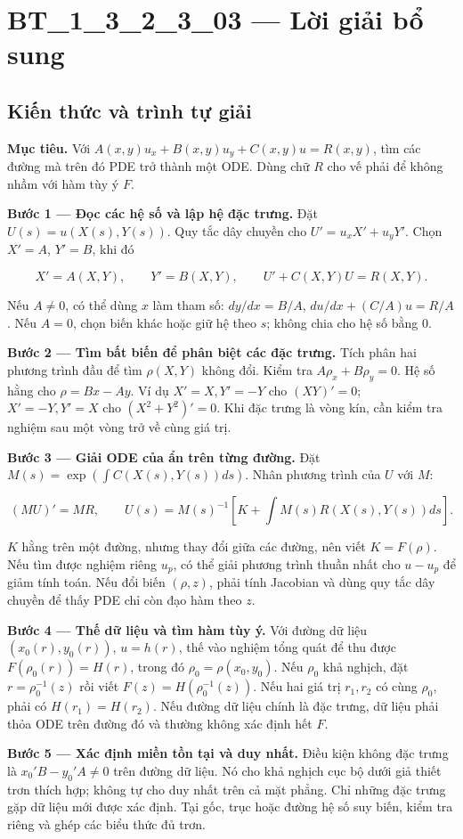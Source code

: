 \documentclass[10pt,a4paper]{article}
\begin{document}
\section*{BT\_1\_3\_2\_3\_03 — Lời giải bổ sung}
\subsection*{Kiến thức và trình tự giải}
\textbf{Mục tiêu.} Với $A(x,y)u_x+B(x,y)u_y+C(x,y)u=R(x,y)$, tìm các đường mà trên đó PDE trở thành một ODE. Dùng chữ $R$ cho vế phải để không nhầm với hàm tùy ý $F$.

\textbf{Bước 1 — Đọc các hệ số và lập hệ đặc trưng.} Đặt $U(s)=u(X(s),Y(s))$. Quy tắc dây chuyền cho $U'=u_xX'+u_yY'$. Chọn $X'=A$, $Y'=B$, khi đó

\[
X'=A(X,Y),\qquad Y'=B(X,Y),\qquad U'+C(X,Y)U=R(X,Y).
\]

Nếu $A\ne0$, có thể dùng $x$ làm tham số: $dy/dx=B/A$, $du/dx+(C/A)u=R/A$. Nếu $A=0$, chọn biến khác hoặc giữ hệ theo $s$; không chia cho hệ số bằng 0.

\textbf{Bước 2 — Tìm bất biến để phân biệt các đặc trưng.} Tích phân hai phương trình đầu để tìm $\rho(X,Y)$ không đổi. Kiểm tra $A\rho_x+B\rho_y=0$. Hệ số hằng cho $\rho=Bx-Ay$. Ví dụ $X'=X,Y'=-Y$ cho $(XY)'=0$; $X'=-Y,Y'=X$ cho $(X^2+Y^2)'=0$. Khi đặc trưng là vòng kín, cần kiểm tra nghiệm sau một vòng trở về cùng giá trị.

\textbf{Bước 3 — Giải ODE của ẩn trên từng đường.} Đặt $M(s)=\exp(\int C(X(s),Y(s))ds)$. Nhân phương trình của $U$ với $M$:

\[
(MU)'=MR,\qquad
U(s)=M(s)^{-1}\left[K+\int M(s)R(X(s),Y(s))ds\right].
\]

$K$ hằng trên một đường, nhưng thay đổi giữa các đường, nên viết $K=F(\rho)$. Nếu tìm được nghiệm riêng $u_p$, có thể giải phương trình thuần nhất cho $u-u_p$ để giảm tính toán. Nếu đổi biến $(\rho,z)$, phải tính Jacobian và dùng quy tắc dây chuyền để thấy PDE chỉ còn đạo hàm theo $z$.

\textbf{Bước 4 — Thế dữ liệu và tìm hàm tùy ý.} Với đường dữ liệu $(x_0(r),y_0(r))$, $u=h(r)$, thế vào nghiệm tổng quát để thu được $F(\rho_0(r))=H(r)$, trong đó $\rho_0=\rho(x_0,y_0)$. Nếu $\rho_0$ khả nghịch, đặt $r=\rho_0^{-1}(z)$ rồi viết $F(z)=H(\rho_0^{-1}(z))$. Nếu hai giá trị $r_1,r_2$ có cùng $\rho_0$, phải có $H(r_1)=H(r_2)$. Nếu đường dữ liệu chính là đặc trưng, dữ liệu phải thỏa ODE trên đường đó và thường không xác định hết $F$.

\textbf{Bước 5 — Xác định miền tồn tại và duy nhất.} Điều kiện không đặc trưng là $x_0'B-y_0'A\ne0$ trên đường dữ liệu. Nó cho khả nghịch cục bộ dưới giả thiết trơn thích hợp; không tự cho duy nhất trên cả mặt phẳng. Chỉ những đặc trưng gặp dữ liệu mới được xác định. Tại gốc, trục hoặc đường hệ số suy biến, kiểm tra riêng và ghép các biểu thức đủ trơn.
\end{document}

